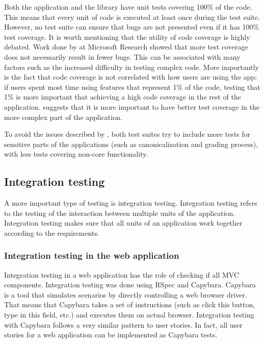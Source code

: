 Both the application and the library have unit tests covering 100\% of the code. This means that every unit of code is executed at least once during the test suite. However, no test suite can ensure that bugs are not presented even if it has 100\% test coverage. It is worth mentioning that the utility of code coverage is highly debated. Work done by \cite{msft_testing} at Microsoft Research showed that more test coverage does not necessarily result in fewer bugs. This can be associated with many factors such as the increased difficulty in testing complex code. More importantly is the fact that code coverage is not correlated with how users are using the app: if users spent most time using features that represent 1\% of the code, testing that 1\% is more important that achieving a high code coverage in the rest of the application. \cite{msft_testing} suggests that it is more important to have better test coverage in the more complex part of the application.

To avoid the issues described by \cite{msft_testing}, both test suites try to include more tests for sensitive parts of the applications (such as canonicalization and grading process), with less tests covering non-core functionality.

\subsection{Integration testing}

A more important type of testing is integration testing. Integration testing refers to the testing of the interaction between multiple units of the application. Integration testing makes sure that all units of an application work together according to the requirements.

\subsubsection{Integration testing in the web application}

Integration testing in a web application has the role of checking if all MVC components. Integration testing was done using RSpec and Capybara. Capybara is a tool that simulates scenarios by directly controlling a web browser driver. That means that Capybara takes a set of instructions (such as click this button, type in this field, etc.) and executes them on actual browser. Integration testing with Capybara follows a very similar pattern to user stories. In fact, all user stories for a web application can be implemented as Capybara tests.


